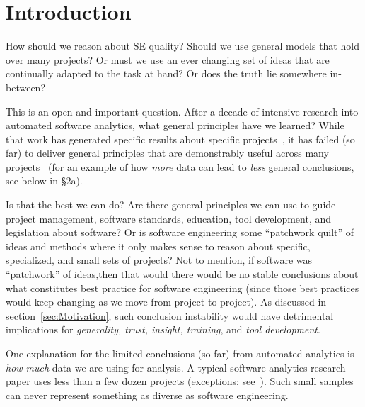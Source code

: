 \documentclass[10pt,journal,compsoc]{IEEEtran}
\begin{document}
\maketitle

\IEEEdisplaynontitleabstractindextext
\IEEEdisplaynontitleabstractindextext


\ifCLASSOPTIONcaptionsoff
 \newpage
\fi

\section{Introduction}
How should we reason about SE quality?  Should we use  general models that hold over many projects? Or must we use an ever changing set of ideas that are   continually adapted to the task at hand? 
Or does the truth lie somewhere in-between?  

This is an open and important question. After a decade of intensive research into automated software analytics, what general principles have we learned? While that work has generated specific results about specific projects~\cite{Bird:2015,menzies2013software}, it has failed (so far) to deliver general principles that are demonstrably useful across many projects~\cite{menzies2013guest} (for an example of how {\em more} data can lead to {\em less} general conclusions, see below in {\S}2a).

Is that the best we can do? Are there general principles we can use to guide project management, software standards, education,   tool development, and legislation about software? 
Or is  software engineering some ``patchwork quilt'' of ideas and methods where it only makes sense to reason about specific, specialized, and small sets of  projects? Not to mention, if software was ``patchwork'' of ideas,then that would  there would be no stable conclusions about what constitutes best practice for software engineering (since those best practices would keep changing as we move from project to project). As discussed in section~\ref{sec:Motivation}, such conclusion instability would have detrimental implications for {\em generality, trust, insight, training}, and {\em tool development}.

One  explanation for the limited conclusions (so far) from automated analytics is  {\em how much} data we are using for analysis. A typical software analytics research paper uses less than a few dozen projects  (exceptions: see~\cite{krishna18a, zhao17, agrawal18}). Such small samples can never represent something as diverse as software engineering. 
\end{document}
